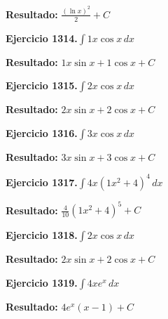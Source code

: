 \documentclass[10pt,a4paper]{article}
\begin{document}
\begin{solbox}
\textbf{Resultado:} \(\displaystyle \frac{(\ln x)^2}{2} + C\)
\end{solbox}

\begin{ejbox}
\textbf{Ejercicio 1314.}\quad $\int 1x \cos x\,dx$
\end{ejbox}

\begin{solbox}
\textbf{Resultado:} \(\displaystyle 1x\sin x + 1\cos x + C\)
\end{solbox}

\newpage
\begin{ejbox}
\textbf{Ejercicio 1315.}\quad $\int 2x \cos x\,dx$
\end{ejbox}

\begin{solbox}
\textbf{Resultado:} \(\displaystyle 2x\sin x + 2\cos x + C\)
\end{solbox}

\begin{ejbox}
\textbf{Ejercicio 1316.}\quad $\int 3x \cos x\,dx$
\end{ejbox}

\begin{solbox}
\textbf{Resultado:} \(\displaystyle 3x\sin x + 3\cos x + C\)
\end{solbox}

\begin{ejbox}
\textbf{Ejercicio 1317.}\quad $\int 4x(1x^2 + 4)^{4}\,dx$
\end{ejbox}

\begin{solbox}
\textbf{Resultado:} \(\displaystyle \frac{4}{10}(1x^2+4)^{5} + C\)
\end{solbox}

\newpage
\begin{ejbox}
\textbf{Ejercicio 1318.}\quad $\int 2x \cos x\,dx$
\end{ejbox}

\begin{solbox}
\textbf{Resultado:} \(\displaystyle 2x\sin x + 2\cos x + C\)
\end{solbox}

\begin{ejbox}
\textbf{Ejercicio 1319.}\quad $\int 4x e^{x}\,dx$
\end{ejbox}

\begin{solbox}
\textbf{Resultado:} \(\displaystyle 4e^x(x-1) + C\)
\end{solbox}
\end{document}
